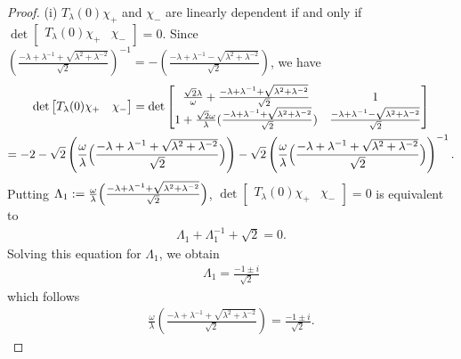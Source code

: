 \documentclass[a4paper,12pt]{article}
\theoremstyle{plain}
\theoremstyle{definition}
\theoremstyle{definition}
\begin{document}
\begin{proof}
($\mathrm{i}$) $T_{\lambda}(0)\chi_{+}$ and $\chi_{-}$ are linearly dependent if and only if $\det \begin{bmatrix}
T_{\lambda}(0)\chi_+& \chi_- 
\end{bmatrix}
=0$. Since $\left(\frac{-\lambda +\lambda^{-1}+\sqrt{\lambda^2+\lambda^{-2}}}{\sqrt{2}}\right)^{-1}=-\left(\frac{-\lambda +\lambda^{-1}-\sqrt{\lambda^2+\lambda^{-2}}}{\sqrt{2}}\right)$, we have
\begin{gather*}
\det \begin{bmatrix}
T_{\lambda}(0)\chi_+& \chi_- 
\end{bmatrix}= \det
\begin{bmatrix}
   \frac{\sqrt{2}\lambda}{\omega} +\frac{-\lambda +\lambda^{-1}+\sqrt{\lambda^2+\lambda^{-2}}}{\sqrt{2}} & 1 \\
   1 + \frac{\sqrt{2}\omega}{\lambda}(\frac{-\lambda +\lambda^{-1}+\sqrt{\lambda^2+\lambda^{-2}}}{\sqrt{2}}) & \frac{-\lambda +\lambda^{-1}-\sqrt{\lambda^2+\lambda^{-2}}}{\sqrt{2}}
\end{bmatrix}\\
=
-2-\sqrt{2}\left( \frac{\omega}{\lambda}\Bigl(\frac{-\lambda +\lambda^{-1}+\sqrt{\lambda^2+\lambda^{-2}}}{\sqrt{2}}\Bigr)\right)-\sqrt{2}\left(\frac{\omega}{\lambda}\Bigl(\frac{-\lambda +\lambda^{-1}+\sqrt{\lambda^2+\lambda^{-2}}}{\sqrt{2}}\Bigr)\right)^{-1}.\nonumber 
\end{gather*}
Putting $\Lambda_{1} := \frac{\omega}{\lambda}\Bigl(\frac{-\lambda +\lambda^{-1}+\sqrt{\lambda^2+\lambda^{-2}}}{\sqrt{2}}\Bigr)$, $\det \begin{bmatrix}
T_{\lambda}(0)\chi_+& \chi_- 
\end{bmatrix}
=0$ is equivalent to
\begin{eqnarray*}
\Lambda_{1}+\Lambda_{1}^{-1}+\sqrt{2}=0.
\end{eqnarray*}
Solving this equation for $\Lambda_1$, we obtain
\begin{eqnarray*}
\Lambda_{1} = \frac{-1\pm i}{\sqrt{2}}
\end{eqnarray*}
which follows
\begin{eqnarray*}
\frac{\omega}{\lambda}\left(\frac{-\lambda +\lambda^{-1}+\sqrt{\lambda^2+\lambda^{-2}}}{\sqrt{2}}\right)=\frac{-1\pm i}{\sqrt{2}}.
\end{eqnarray*}


\end{proof}
\end{document}

